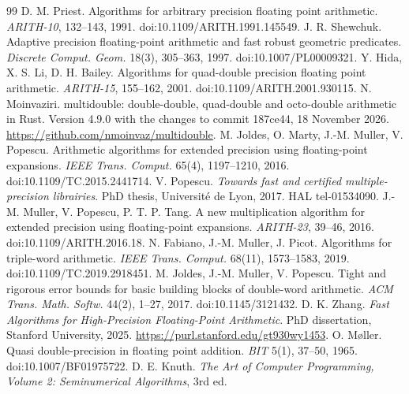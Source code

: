 \documentclass[conference]{IEEEtran}
\theoremstyle{definition}
\theoremstyle{remark}
\begin{document}
\renewcommand{\dblfloatpagefraction}{0.3}
\clearpage
{}
\begin{thebibliography}{99}
 D. M. Priest. Algorithms for arbitrary precision floating point arithmetic. \emph{ARITH-10},
132--143, 1991. doi:10.1109/ARITH.1991.145549.
 J. R. Shewchuk. Adaptive precision floating-point arithmetic and fast robust geometric predicates.
\emph{Discrete Comput. Geom.} 18(3), 305--363, 1997. doi:10.1007/PL00009321.
 Y. Hida, X. S. Li, D. H. Bailey. Algorithms for quad-double precision floating point arithmetic.
\emph{ARITH-15}, 155--162, 2001. doi:10.1109/ARITH.2001.930115.
 N. Moinvaziri. multidouble: double-double, quad-double and octo-double arithmetic in Rust. Version 4.9.0
with the changes to commit 187ce44, 18 November 2026. \url{https://github.com/nmoinvaz/multidouble}.
 M. Joldes, O. Marty, J.-M. Muller, V. Popescu. Arithmetic algorithms for extended precision using
floating-point expansions. \emph{IEEE Trans. Comput.} 65(4), 1197--1210, 2016. doi:10.1109/TC.2015.2441714.
 V. Popescu. \emph{Towards fast and certified multiple-precision librairies}. PhD thesis, Universit\'e
de Lyon, 2017. HAL tel-01534090.
 J.-M. Muller, V. Popescu, P. T. P. Tang. A new multiplication algorithm for extended precision using
floating-point expansions. \emph{ARITH-23}, 39--46, 2016. doi:10.1109/ARITH.2016.18.
 N. Fabiano, J.-M. Muller, J. Picot. Algorithms for triple-word arithmetic. \emph{IEEE Trans. Comput.}
68(11), 1573--1583, 2019. doi:10.1109/TC.2019.2918451.
 M. Joldes, J.-M. Muller, V. Popescu. Tight and rigorous error bounds for basic building blocks of
double-word arithmetic. \emph{ACM Trans. Math. Softw.} 44(2), 1--27, 2017. doi:10.1145/3121432.
 D. K. Zhang. \emph{Fast Algorithms for High-Precision Floating-Point Arithmetic}. PhD dissertation,
Stanford University, 2025. \url{https://purl.stanford.edu/gt930wy1453}.
 O. M{\o}ller. Quasi double-precision in floating point addition. \emph{BIT} 5(1), 37--50, 1965.
doi:10.1007/BF01975722.
 D. E. Knuth. \emph{The Art of Computer Programming, Volume 2: Seminumerical Algorithms}, 3rd ed.

\end{thebibliography}
\end{document}
